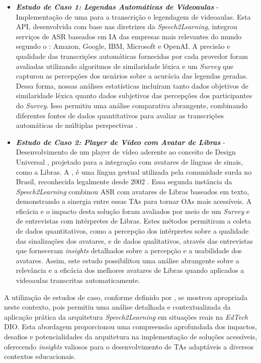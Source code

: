 \begin{itemize}
\item \textbf{\textit{Estudo de Caso 1: Legendas Automáticas de Videoaulas}} - Implementação de uma  para a transcrição e legendagem de videoaulas. Esta API, desenvolvida com base nas diretrizes da \textit{Speech2Learning}, integrou serviços de ASR baseados em IA das empresas mais relevantes do mundo segundo o : Amazon, Google, IBM, Microsoft e OpenAI. A precisão e qualidade das transcrições automáticas fornecidas por cada provedor foram avaliadas utilizando algoritmos de similaridade léxica e um \textit{Survey} que capturou as percepções dos usuários sobre a acurácia das legendas geradas. Dessa forma, nossas análises estatísticas incluíram tanto dados objetivos de similaridade léxica quanto dados subjetivos das percepções dos participantes do \textit{Survey}. Isso permitiu uma análise comparativa abrangente, combinando diferentes fontes de dados quantitativos para avaliar as transcrições automáticas de múltiplas perspectivas \cite{FalvoJr2023_HICSS, FalvoJr2024_FIE}.

\item \textbf{\textit{Estudo de Caso 2: Player de Vídeo com Avatar de Libras}} - Desenvolvimento de um player de vídeo aderente ao conceito de Design Universal \cite{GovBr2023}, projetado para a integração com avatares de línguas de sinais, como a Libras. A , é uma língua gestual utilizada pela comunidade surda no Brasil, reconhecida legalmente desde 2002 \cite{Quadros2017, Quadros2019, Honora2021}. Essa segunda instância da \textit{Speech2Learning} combinou ASR com avatares de Libras baseados em texto, demonstrando a sinergia entre essas TAs para tornar OAs mais acessíveis. A eficácia e o impacto desta solução foram avaliados por meio de um \textit{Survey} e de entrevistas com intérpretes de Libras. Estes métodos permitiram a coleta de dados quantitativos, como a percepção dos intérpretes sobre a qualidade das sinalizações dos avatares, e de dados qualitativos, através das entrevistas que forneceram \textit{insights} detalhados sobre a percepção e a usabilidade dos avatares. Assim, este estudo possibilitou uma análise abrangente sobre a relevância e a eficácia dos melhores avatares de Libras quando aplicados a videoaulas transcritas automaticamente.
\end{itemize}

A utilização de estudos de caso, conforme definido por , se mostrou apropriada neste contexto, pois permitiu uma análise detalhada e contextualizada da aplicação prática da arquitetura \textit{Speech2Learning} em situações reais na \textit{EdTech} DIO. Esta abordagem proporcionou uma compreensão aprofundada dos impactos, desafios e potencialidades da arquitetura na implementação de soluções acessíveis, oferecendo \textit{insights} valiosos para o desenvolvimento de TAs adaptáveis a diversos contextos educacionais.

